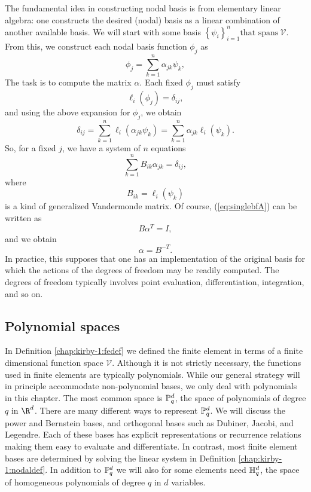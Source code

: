 The fundamental idea in constructing nodal basis is from elementary
linear algebra: one constructs the desired (nodal) basis as a linear
combination of another available basis.  We will start with some basis
$\left\{ \psi_i \right\}_{i=1}^{n} \mbox{that spans} \ \mathcal{V}$.
From this, we construct each nodal basis function $\phi_j$ as
%
\begin{equation}
 \phi_j = \sum_{k=1}^n \alpha_{jk} \psi_k,
\end{equation}
The task is to compute the matrix $\alpha$.  Each fixed $\phi_j$ must
satisfy
\begin{equation}
\ell_i( \phi_j ) = \delta_{ij},
\end{equation}
and using the above expansion for $\phi_j$, we obtain
\begin{equation}
\delta_{ij} = \sum_{k=1}^n \ell_i( \alpha_{jk} \psi_{k} ) = \sum_{k=1}^n \alpha_{jk} \ell_i (\psi_k).
\end{equation}
So, for a fixed $j$, we have a system of $n$ equations
\begin{equation}
\label{eq:singlebfA}
\sum_{k=1}^n B_{ik} \alpha_{jk} = \delta_{ij},
\end{equation}
where
\begin{equation}
B_{ik} = \ell_i(\psi_k)
\end{equation}
is a kind of generalized Vandermonde matrix. Of course,
(\ref{eq:singlebfA}) can be written as
\begin{equation}
B \alpha^T = I,
\end{equation}
and we obtain
\begin{equation}
\alpha = B^{-T}.
\end{equation}
In practice, this supposes that one has an implementation of the original
basis for which the actions of the degrees of freedom may be readily
computed.  The degrees of freedom typically involves point evaluation,
differentiation, integration, and so on.


\subsection{Polynomial spaces}

In Definition \ref{chap:kirby-1:fedef} we defined the finite element in
terms of a finite dimensional function space $\mathcal{V}$. Although it
is not strictly necessary, the functions used in finite elements are
typically polynomials.  While our general strategy will in principle
accommodate non-polynomial bases, we only deal with polynomials
in this chapter.  The most common space is $\P_q^d$, the space of
polynomials of degree $q$ in $\R^d$. There are many different ways
to represent $\P^d_q$. We will discuss the power and Bernstein bases,
and orthogonal bases such as Dubiner, Jacobi, and Legendre.  Each of
these bases has explicit representations or recurrence relations making
them easy to evaluate and differentiate. In contrast, most finite
element bases are determined by solving the linear system in Definition
\ref{chap:kirby-1:nodaldef}.  In addition to $\P^d_q$ we will also for
some elements need $\H^d_q$, the space of homogeneous polynomials of
degree $q$ in $d$ variables.

